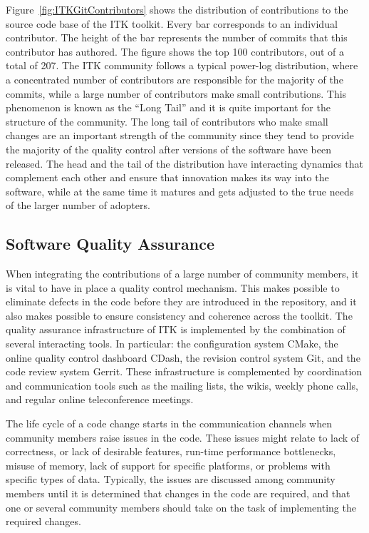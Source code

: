 \documentclass{frontiersENG} %
\begin{document}
Figure~\ref{fig:ITKGitContributors} shows the distribution of contributions
to the source code base of the ITK toolkit. Every bar corresponds to an individual
contributor. The height of the bar represents the number of commits that this
contributor has authored. The figure shows the top 100 contributors, out of a
total of 207. The ITK community follows a typical power-log distribution, where
a concentrated number of contributors are responsible for the majority of the
commits, while a large number of contributors make small contributions.  This
phenomenon is known as the ``Long Tail'' and it is quite important for the
structure of the community. The long tail of contributors who make small
changes are an important strength of the community since they tend to provide
the majority of the quality control after versions of the software have been
released. The head and the tail of the distribution have interacting dynamics
that complement each other and ensure that innovation makes its way into the
software, while at the same time it matures and gets adjusted to the true needs
of the larger number of adopters.

\subsection{Software Quality Assurance}

When integrating the contributions of a large number of community members, it
is vital to have in place a quality control mechanism. This makes possible to
eliminate defects in the code before they are introduced in the repository, and
it also makes possible to ensure consistency and coherence across the toolkit.
The quality assurance infrastructure of ITK is implemented by the combination
of several interacting tools. In particular: the configuration system CMake,
the online quality control dashboard CDash, the revision control system Git,
and the code review system Gerrit. These infrastructure is complemented by
coordination and communication tools such as the mailing lists, the wikis,
weekly phone calls, and regular online teleconference meetings.

The life cycle of a code change starts in the communication channels when
community members raise issues in the code. These issues might relate to lack
of correctness, or lack of desirable features, run-time performance
bottlenecks, misuse of memory, lack of support for specific platforms, or
problems with specific types of data. Typically, the issues are discussed among
community members until it is determined that changes in the code are required,
and that one or several community members should take on the task of
implementing the required changes.
\end{document}
